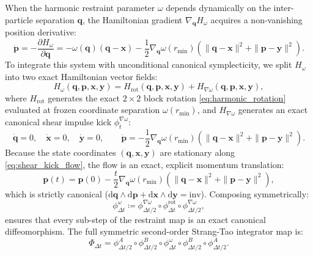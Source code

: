 \documentclass[11pt,a4paper,reqno]{article}
\theoremstyle{plain}
\theoremstyle{definition}
\theoremstyle{remark}
\numberwithin{equation}{section}
\begin{document}
When the harmonic restraint parameter $\omega$ depends dynamically on the inter-particle separation $\bm{q}$, the Hamiltonian gradient $\nabla_{\bm{q}} H_\omega$ acquires a non-vanishing position derivative:
\begin{equation}
\dot{\bm{p}} = -\frac{\partial H_\omega}{\partial \bm{q}} = -\omega(\bm{q})(\bm{q} - \bm{x}) - \frac{1}{2} \nabla_{\bm{q}}\omega(r_{\min}) \left( \|\bm{q} - \bm{x}\|^2 + \|\bm{p} - \bm{y}\|^2 \right).
\end{equation}
To integrate this system with unconditional canonical symplecticity, we split $H_\omega$ into two exact Hamiltonian vector fields:
\begin{equation}
H_\omega(\bm{q}, \bm{p}, \bm{x}, \bm{y}) = H_{\mathrm{rot}}(\bm{q}, \bm{p}, \bm{x}, \bm{y}) + H_{\nabla \omega}(\bm{q}, \bm{p}, \bm{x}, \bm{y}),
\end{equation}
where $H_{\mathrm{rot}}$ generates the exact $2\times 2$ block rotation \eqref{eq:harmonic_rotation} evaluated at frozen coordinate separation $\omega(r_{\min})$, and $H_{\nabla \omega}$ generates an exact canonical shear impulse kick $\phi_t^{\nabla \omega}$:
\begin{equation}
\dot{\bm{q}} = 0, \quad \dot{\bm{x}} = 0, \quad \dot{\bm{y}} = 0, \qquad \dot{\bm{p}} = -\frac{1}{2} \nabla_{\bm{q}}\omega(r_{\min}) \left( \|\bm{q} - \bm{x}\|^2 + \|\bm{p} - \bm{y}\|^2 \right).
\label{eq:shear_kick_flow}
\end{equation}
Because the state coordinates $(\bm{q}, \bm{x}, \bm{y})$ are stationary along \eqref{eq:shear_kick_flow}, the flow is an exact, explicit momentum translation:
\begin{equation}
\bm{p}(t) = \bm{p}(0) - \frac{t}{2} \nabla_{\bm{q}}\omega(r_{\min}) \left( \|\bm{q} - \bm{x}\|^2 + \|\bm{p} - \bm{y}\|^2 \right),
\end{equation}
which is strictly canonical ($\mathrm{d}\bm{q} \wedge \mathrm{d}\bm{p} + \mathrm{d}\bm{x} \wedge \mathrm{d}\bm{y} = \text{inv}$). Composing symmetrically:
\begin{equation}
\phi_{\Delta t}^\omega \coloneqq \phi_{\Delta t / 2}^{\nabla \omega} \circ \phi_{\Delta t}^{\mathrm{rot}} \circ \phi_{\Delta t / 2}^{\nabla \omega},
\label{eq:composite_omega_flow}
\end{equation}
ensures that every sub-step of the restraint map is an exact canonical diffeomorphism. The full symmetric second-order Strang-Tao integrator map is:
\begin{equation}
\Phi_{\Delta t} = \phi_{\Delta t / 2}^A \circ \phi_{\Delta t / 2}^B \circ \phi_{\Delta t}^\omega \circ \phi_{\Delta t / 2}^B \circ \phi_{\Delta t / 2}^A.
\label{eq:strang_tao_map}
\end{equation}
\end{document}
